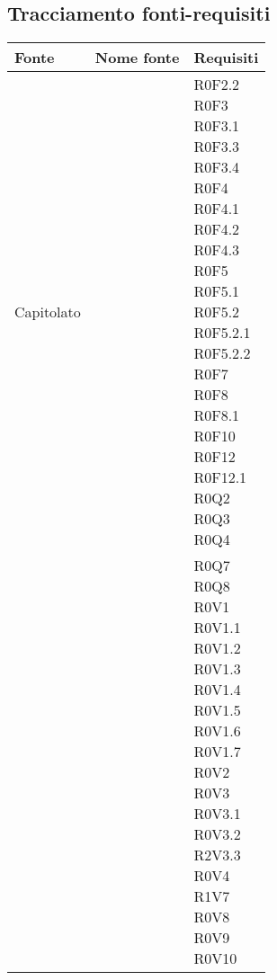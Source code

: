\documentclass[AnalisiDeiRequisiti.tex]{subfiles}
\begin{document}
\subsection{Tracciamento fonti-requisiti}

\label{table:Tabella di tracciamento fonti-requisiti}


\renewcommand*{\arraystretch}{1.2}
\begin{longtable}[H]{p{2cm}p{5cm}p{5cm}}
	\rowcolor{CHeader} 
	\color{CHeaderText} \textbf{Fonte} & \color{CHeaderText} \textbf{Nome fonte} & \color{CHeaderText} \textbf{Requisiti} \\
	\endhead
	Capitolato & & \makecell[tl]{ R0F2.2 \\
	 R0F3 \\
	 R0F3.1 \\
	 R0F3.3 \\
	 R0F3.4 \\
	 R0F4 \\
	 R0F4.1 \\
	 R0F4.2 \\
	 R0F4.3 \\
	 R0F5 \\
	 R0F5.1 \\
	 R0F5.2 \\
	 R0F5.2.1 \\
	 R0F5.2.2 \\
	 R0F7 \\
	 R0F8 \\
	 R0F8.1 \\
	 R0F10 \\
	 R0F12\\
	 R0F12.1 \\
	 R0Q2 \\
	 R0Q3 \\
	 R0Q4 
 	} \\
 	\rowcolor{CRigheDispari}
 	& & \makecell[tl]{
	 R0Q7 \\
	 R0Q8 \\
	 R0V1 \\
	 R0V1.1 \\
	 R0V1.2 \\
	 R0V1.3 \\
	 R0V1.4 \\
	 R0V1.5 \\
	 R0V1.6 \\
	 R0V1.7 \\
	 R0V2 \\
	 R0V3 \\
	 R0V3.1 \\
	 R0V3.2 \\
	 R2V3.3 \\
	 R0V4 \\
	 R1V7 \\
	 R0V8 \\
	 R0V9 \\
	 R0V10 } \\
	

\end{longtable}
\end{document}
